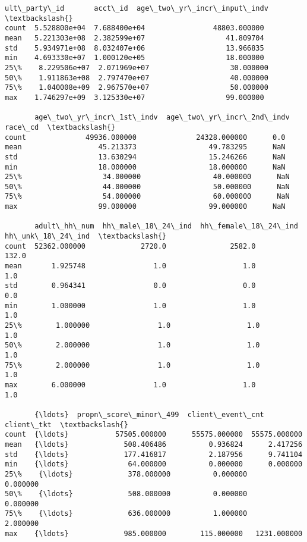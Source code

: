 \documentclass[11pt]{article}
\makeatletter
\newcommand{\boxspacing}{\kern\kvtcb@left@rule\kern\kvtcb@boxsep}
\newcommand{\prompt}[4]{
        {\ttfamily\llap{{\color{#2}[#3]:\hspace{3pt}#4}}\vspace{-\baselineskip}}
    }
\makeatother
\begin{document}
            \begin{tcolorbox}[breakable, size=fbox, boxrule=.5pt, pad at break*=1mm, opacityfill=0]
\prompt{Out}{outcolor}{23}{\boxspacing}
\begin{Verbatim}[commandchars=\\\{\}]
       ult\_party\_id       acct\_id  age\_two\_yr\_incr\_input\_indv  \textbackslash{}
count  5.528800e+04  7.688400e+04                48803.000000
mean   5.221303e+08  2.382599e+07                   41.809704
std    5.934971e+08  8.032407e+06                   13.966835
min    4.693330e+07  1.000120e+05                   18.000000
25\%    8.229506e+07  2.071969e+07                   30.000000
50\%    1.911863e+08  2.797470e+07                   40.000000
75\%    1.040008e+09  2.967570e+07                   50.000000
max    1.746297e+09  3.125330e+07                   99.000000

       age\_two\_yr\_incr\_1st\_indv  age\_two\_yr\_incr\_2nd\_indv  race\_cd  \textbackslash{}
count              49936.000000              24328.000000      0.0
mean                  45.213373                 49.783295      NaN
std                   13.630294                 15.246266      NaN
min                   18.000000                 18.000000      NaN
25\%                   34.000000                 40.000000      NaN
50\%                   44.000000                 50.000000      NaN
75\%                   54.000000                 60.000000      NaN
max                   99.000000                 99.000000      NaN

       adult\_hh\_num  hh\_male\_18\_24\_ind  hh\_female\_18\_24\_ind  hh\_unk\_18\_24\_ind  \textbackslash{}
count  52362.000000             2720.0               2582.0             132.0
mean       1.925748                1.0                  1.0               1.0
std        0.964341                0.0                  0.0               0.0
min        1.000000                1.0                  1.0               1.0
25\%        1.000000                1.0                  1.0               1.0
50\%        2.000000                1.0                  1.0               1.0
75\%        2.000000                1.0                  1.0               1.0
max        6.000000                1.0                  1.0               1.0

       {\ldots}  propn\_score\_minor\_499  client\_event\_cnt    client\_tkt  \textbackslash{}
count  {\ldots}           57505.000000      55575.000000  55575.000000
mean   {\ldots}             508.406486          0.936824      2.417256
std    {\ldots}             177.416817          2.187956      9.741104
min    {\ldots}              64.000000          0.000000      0.000000
25\%    {\ldots}             378.000000          0.000000      0.000000
50\%    {\ldots}             508.000000          0.000000      0.000000
75\%    {\ldots}             636.000000          1.000000      2.000000
max    {\ldots}             985.000000        115.000000   1231.000000


\end{Verbatim}
\end{tcolorbox}
\end{document}
